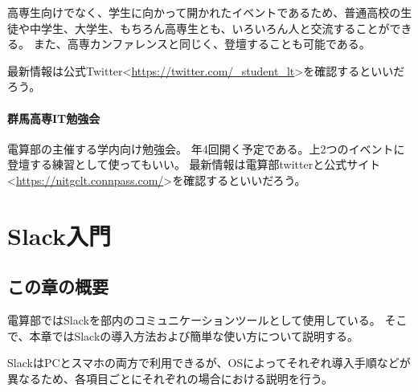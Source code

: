 \documentclass[lualatex,ja=standard,12pt,a4j]{bxjsbook}
\begin{document}
					高専生向けでなく、学生に向かって開かれたイベントであるため、普通高校の生徒や中学生、大学生、もちろん高専生とも、いろいろん人と交流することができる。
					また、高専カンファレンスと同じく、登壇することも可能である。
					
					最新情報は公式Twitter<\url{https://twitter.com/_student_lt}>を確認するといいだろう。
				\subsubsection{群馬高専IT勉強会}
					電算部の主催する学内向け勉強会。
					年4回開く予定である。上2つのイベントに登壇する練習として使ってもいい。
					最新情報は電算部twitterと公式サイト<\url{https://nitgclt.connpass.com/}>を確認するといいだろう。
	\chapter{Slack入門}
		\section{この章の概要}
			電算部ではSlackを部内のコミュニケーションツールとして使用している。
            そこで、本章ではSlackの導入方法および簡単な使い方について説明する。
            
            SlackはPCとスマホの両方で利用できるが、OSによってそれぞれ導入手順などが異なるため、各項目ごとにそれぞれの場合における説明を行う。
\end{document}
